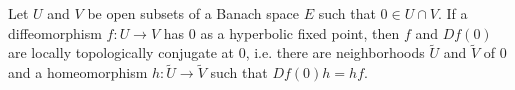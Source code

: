 \documentclass[12pt]{article}
\begin{document}
Let $U$ and $V$ be open subsets of a Banach space $E$ such that $0\in U\cap V$.
If a diffeomorphism $f\colon U\to V$ has $0$ as a hyperbolic fixed
point, then $f$ and $Df(0)$ are locally topologically conjugate at $0$, 
i.e. there are neighborhoods $\tilde U$ and $\tilde V$ of $0$ and a homeomorphism  $h\colon \tilde U\to \tilde V$ such that
$Df(0)h = hf$.
\end{document}
